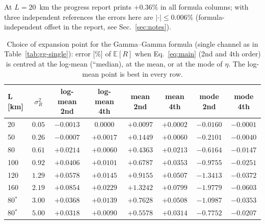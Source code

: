 \documentclass[11pt,a4paper]{article}
\theoremstyle{plain}
\theoremstyle{remark}
\begin{document}
\begin{table}[htbp]
\begin{tabular}{lccccccccc}
\bottomrule
\end{tabular}
\par\smallskip
\begin{minipage}{0.95\linewidth}\footnotesize At $L=20$~km the progress report prints $+0.36\%$ in all formula columns; with three independent references the errors here are $|\cdot|\le0.006\%$ (formula-independent offset in the report, see Sec.~\ref{sec:notes}).\end{minipage}
\end{table}

\begin{table}[htbp]
\centering\small
\caption{Choice of expansion point for the Gamma--Gamma formula (single channel as in Table~\ref{tab:gg-single}): error [\%] of $\mathbb E[R]$ when Eq.~\eqref{eq:main} (2nd and 4th order) is centred at the log-mean (``median), at the mean, or at the mode of $\eta$. The log-mean point is best in every row.}
\label{tab:expoint}
\begin{tabular}{lccccccc}
\toprule
L [km] & $\sigma_R^2$ & log-mean 2nd & log-mean 4th & mean 2nd & mean 4th & mode 2nd & mode 4th\\
\midrule
20 & $0.05$ & $-0.0013$ & $0.0000$ & $+0.0097$ & $+0.0002$ & $-0.0160$ & $-0.0001$ \\
50 & $0.26$ & $-0.0007$ & $+0.0017$ & $+0.1449$ & $+0.0060$ & $-0.2101$ & $-0.0040$ \\
80 & $0.61$ & $+0.0214$ & $+0.0060$ & $+0.4363$ & $+0.0213$ & $-0.6164$ & $-0.0147$ \\
100 & $0.92$ & $+0.0406$ & $+0.0101$ & $+0.6787$ & $+0.0353$ & $-0.9755$ & $-0.0251$ \\
120 & $1.29$ & $+0.0578$ & $+0.0145$ & $+0.9155$ & $+0.0507$ & $-1.3413$ & $-0.0372$ \\
160 & $2.19$ & $+0.0854$ & $+0.0229$ & $+1.3242$ & $+0.0799$ & $-1.9779$ & $-0.0603$ \\
80$^{*}$ & $3.00$ & $+0.0368$ & $+0.0139$ & $+0.7628$ & $+0.0508$ & $-1.0987$ & $-0.0353$ \\
80$^{*}$ & $5.00$ & $+0.0318$ & $+0.0090$ & $+0.5578$ & $+0.0314$ & $-0.7752$ & $-0.0207$ \\

\bottomrule
\end{tabular}
\end{table}
\end{document}

